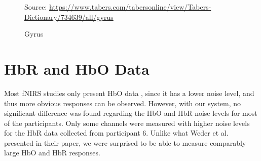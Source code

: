 \begin{figure}[h]
  \centering
           {Source: \url{https://www.tabers.com/tabersonline/view/Tabers-Dictionary/734639/all/gyrus}}
  \caption{Gyrus}
  \label{fig:gyrus}
\end{figure}


\section{HbR and HbO Data}
Most fNIRS studies only present HbO data \cite{Ferrari2012}, since it has a lower noise level, and thus more obvious responses can be observed. However, with our system, no significant difference was found regarding the HbO and HbR noise levels for most of the participants. Only some channels were measured with higher noise levels for the HbR data collected from participant 6. Unlike what Weder et al. \citeyear{Weder2018} presented in their paper, we were surprised to be able to measure comparably large HbO and HbR responses.


